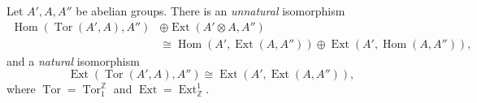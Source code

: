 Let $A', A, A''$ be abelian groups. There is an \emph{unnatural} isomorphism
\begin{align*}
\operatorname{Hom}(\operatorname{Tor}(A', A), A'') &\oplus \operatorname{Ext}(A' \otimes A, A'') \\
&\cong \operatorname{Hom}(A', \operatorname{Ext}(A, A'')) \oplus \operatorname{Ext}(A', \operatorname{Hom}(A, A'')),
\end{align*}
and a \emph{natural} isomorphism
$$\operatorname{Ext}(\operatorname{Tor}(A', A), A'') \cong \operatorname{Ext}(A', \operatorname{Ext}(A, A'')),$$
where $\operatorname{Tor} = \operatorname{Tor}_1^{\mathbb{Z}}$ and $\operatorname{Ext} = \operatorname{Ext}_{\mathbb{Z}}^1$.

